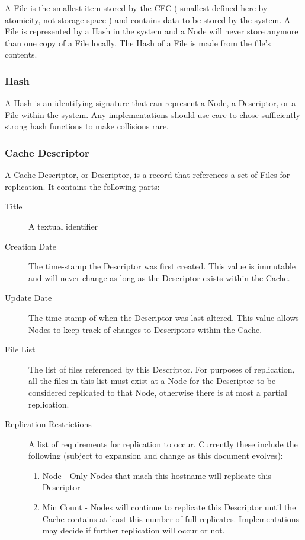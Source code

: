 \documentclass[letterpaper,11pt]{article}
\begin{document}
A File is the smallest item stored by the CFC ( smallest defined here by atomicity, not storage space ) and contains data to be stored by the system. A File is represented by a Hash in the system and a Node will never store anymore than one copy of a File locally. The Hash of a File is made from the file's contents.

\subsubsection{Hash}

A Hash is an identifying signature that can represent a Node, a Descriptor, or a File within the system. Any implementations should use care to chose sufficiently strong hash functions to make collisions rare.

\subsubsection{Cache Descriptor}
A Cache Descriptor, or Descriptor, is a record that references a set of Files for replication. It contains the following parts:

\begin{description}
\item[Title] A textual identifier
\item[Creation Date] The time-stamp the Descriptor was first created. This value is immutable and will never change as long as the Descriptor exists within the Cache.
\item[Update Date] The time-stamp of when the Descriptor was last altered. This value allows Nodes to keep track of changes to Descriptors within the Cache.
\item[File List] The list of files referenced by this Descriptor. For purposes of replication, all the files in this list must exist at a Node for the Descriptor to be considered replicated to that Node, otherwise there is at most a partial replication.
\item[Replication Restrictions] A list of requirements for replication to occur. Currently these include the following (subject to expansion and change as this document evolves):
\begin{enumerate}
\item Node - Only Nodes that mach this hostname will replicate this Descriptor
\item Min Count - Nodes will continue to replicate this Descriptor until the Cache contains at least this number of full replicates. Implementations may decide if further replication will occur or not.
\end{enumerate}
\end{description}
\end{document}
